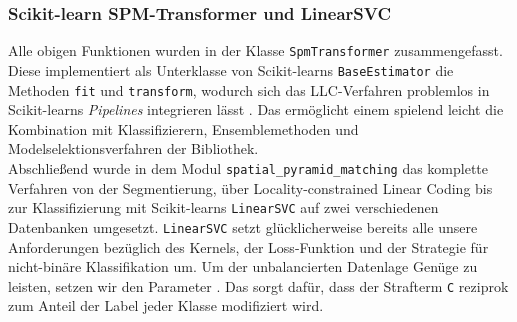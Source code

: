 \subsubsection{Scikit-learn SPM-Transformer und LinearSVC}
\label{sec:llc}

Alle obigen Funktionen wurden in der Klasse \texttt{SpmTransformer} zusammengefasst. Diese implementiert als Unterklasse von Scikit-learns \texttt{BaseEstimator} die Methoden \texttt{fit} und \texttt{transform}, wodurch sich das LLC-Verfahren problemlos in Scikit-learns \emph{Pipelines} integrieren lässt \cite{sklearn}. Das ermöglicht einem spielend leicht die Kombination mit Klassifizierern, Ensemblemethoden und Modelselektionsverfahren der Bibliothek. \\
Abschließend wurde in dem Modul \texttt{spatial\_pyramid\_matching} das komplette Verfahren von der Segmentierung, über Locality-constrained Linear Coding bis zur Klassifizierung mit Scikit-learns \texttt{LinearSVC} auf zwei verschiedenen Datenbanken umgesetzt. \texttt{LinearSVC} setzt glücklicherweise bereits alle unsere Anforderungen bezüglich des Kernels, der Loss-Funktion und der Strategie für nicht-binäre Klassifikation um. Um der unbalancierten Datenlage Genüge zu leisten, setzen wir den Parameter . Das sorgt dafür, dass der Strafterm \texttt{C} reziprok zum Anteil der Label jeder Klasse modifiziert wird.